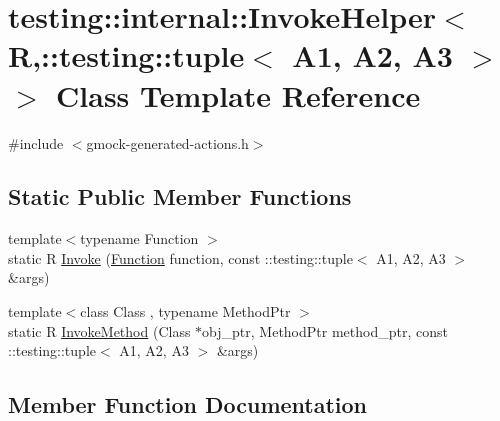 \hypertarget{classtesting_1_1internal_1_1InvokeHelper_3_01R_00_1_1testing_1_1tuple_3_01A1_00_01A2_00_01A3_01_4_01_4}{}\section{testing\+:\+:internal\+:\+:Invoke\+Helper$<$ R,\+:\+:testing\+:\+:tuple$<$ A1, A2, A3 $>$ $>$ Class Template Reference}
\label{classtesting_1_1internal_1_1InvokeHelper_3_01R_00_1_1testing_1_1tuple_3_01A1_00_01A2_00_01A3_01_4_01_4}


{\ttfamily \#include $<$gmock-\/generated-\/actions.\+h$>$}

\subsection*{Static Public Member Functions}
\begin{DoxyCompactItemize}
\item 
{\footnotesize template$<$typename Function $>$ }\\static R \hyperlink{classtesting_1_1internal_1_1InvokeHelper_3_01R_00_1_1testing_1_1tuple_3_01A1_00_01A2_00_01A3_01_4_01_4_a0cb7e7c04bff8e283e9f1805e71390fe}{Invoke} (\hyperlink{structtesting_1_1internal_1_1Function}{Function} function, const \+::testing\+::tuple$<$ A1, A2, A3 $>$ \&args)
\item 
{\footnotesize template$<$class Class , typename Method\+Ptr $>$ }\\static R \hyperlink{classtesting_1_1internal_1_1InvokeHelper_3_01R_00_1_1testing_1_1tuple_3_01A1_00_01A2_00_01A3_01_4_01_4_a828f26ec4ab71a22f77d473c7de8589f}{Invoke\+Method} (Class $\ast$obj\+\_\+ptr, Method\+Ptr method\+\_\+ptr, const \+::testing\+::tuple$<$ A1, A2, A3 $>$ \&args)
\end{DoxyCompactItemize}


\subsection{Member Function Documentation}
